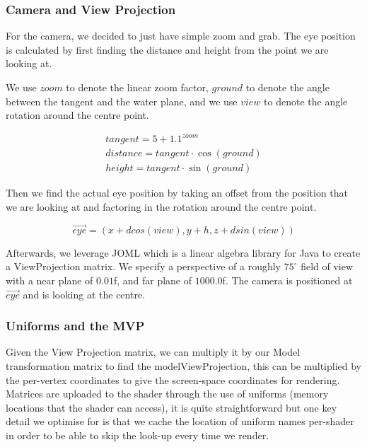 \documentclass{article}
\begin{document}
\begin{multicols}{2}
                \subsubsection{Camera and View Projection}

                    For the camera, we decided to just have simple zoom and grab. The eye position is calculated by first finding the distance and height from the point we are looking at.

                    We use $zoom$ to denote the linear zoom factor, $ground$ to denote the angle between the tangent and the water plane, and we use $view$ to denote the angle rotation around the centre point.

                    \[
                        \begin{array}{l}
                            tangent = 5 + 1.1^{zoom} \\
                            distance = tangent \cdot \cos(ground) \\
                            height = tangent \cdot \sin(ground)
                        \end{array}
                    \]

                    Then we find the actual eye position by taking an offset from the position that we are looking at and factoring in the rotation around the centre point.

                    \[
                        \vec{eye} = (x + d cos(view), y + h, z + d sin(view))
                    \]

                    Afterwards, we leverage JOML \cite{JOML} which is a linear algebra library for Java to create a ViewProjection matrix. We specify a perspective of a roughly $ 75^\circ $ field of view with a near plane of $ 0.01 $f, and far plane of $ 1000.0 $f. The camera is positioned at $ \vec{eye} $ and is looking at the centre.

                \subsubsection{Uniforms and the MVP}

                    Given the View Projection matrix, we can multiply it by our Model transformation matrix to find the modelViewProjection, this can be multiplied by the per-vertex coordinates to give the screen-space coordinates for rendering.
                    Matrices are uploaded to the shader through the use of uniforms (memory locations that the shader can access), it is quite straightforward but one key detail we optimise for is that we cache the location of uniform names per-shader in order to be able to skip the look-up every time we render.


\end{multicols}
\end{document}
